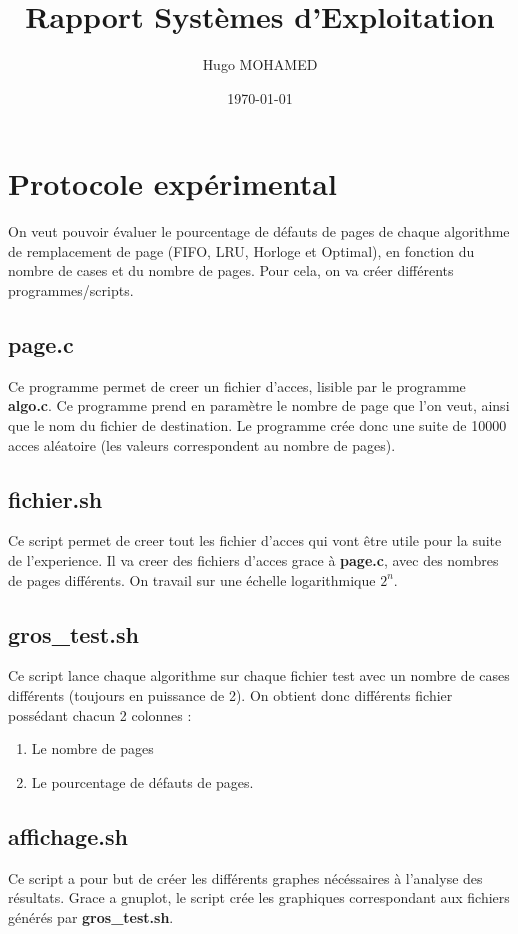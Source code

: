 \documentclass[a4paper, 12pt]{article}
\title{Rapport Systèmes d'Exploitation}
\author{Hugo MOHAMED}
\date{\today}
\begin{document}
\maketitle

\newpage

\tableofcontents

\newpage

\section{Protocole expérimental}
On veut pouvoir évaluer le pourcentage de défauts de pages de chaque algorithme de remplacement de page (FIFO, LRU, Horloge et Optimal), en fonction du nombre de cases et du nombre de pages. Pour cela, on va créer différents programmes/scripts.

\subsection{page.c}
Ce programme permet de creer un fichier d'acces, lisible par le programme \textbf{algo.c}. Ce programme prend en paramètre le nombre de page que l'on veut, ainsi que le nom du fichier de destination. Le programme crée donc une suite de 10000 acces aléatoire (les valeurs correspondent au nombre de pages).

\subsection{fichier.sh}
Ce script permet de creer tout les fichier d'acces qui vont être utile pour la suite de l'experience. Il va creer des fichiers d'acces grace à \textbf{page.c}, avec des nombres de pages différents. On travail sur une échelle logarithmique $2^n$.

\subsection{gros\_test.sh}
Ce script lance chaque algorithme sur chaque fichier test avec un nombre de cases différents (toujours en puissance de 2). On obtient donc différents fichier possédant chacun 2 colonnes :

\begin{enumerate}
\item Le nombre de pages
\item Le pourcentage de défauts de pages.
\end{enumerate}

\subsection{affichage.sh}
Ce script a pour but de créer les différents graphes nécéssaires à l'analyse des résultats. Grace a gnuplot, le script crée les graphiques correspondant aux fichiers générés par \textbf{gros\_test.sh}.
\end{document}
